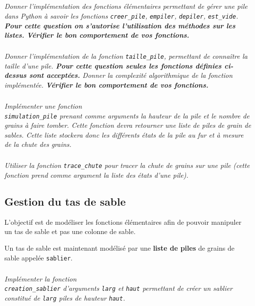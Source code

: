 \documentclass[10pt,fleqn]{article} %
\begin{document}
\begin{multicols}{2}
\subparagraph{}
\textit{Donner l'implémentation des fonctions élémentaires permettant de gérer une pile dans Python à savoir les fonctions \texttt{creer\_pile}, \texttt{empiler}, \texttt{depiler}, \texttt{est\_vide}. \textbf{Pour cette question on s'autorise l'utilisation des méthodes sur les listes.} \textbf{Vérifier le bon comportement de vos fonctions.}}


\subparagraph{}
\textit{Donner l'implémentation de la fonction \texttt{taille\_pile}, permettant de connaître la taille d'une pile. \textbf{Pour cette question seules les fonctions définies ci-dessus sont acceptées.} Donner la complexité algorithmique de la fonction implémentée. \textbf{Vérifier le bon comportement de vos fonctions.}}

\subparagraph{}
\textit{Implémenter une fonction \\ \texttt{simulation\_pile} prenant comme arguments la hauteur de la pile et le nombre de grains à faire tomber. Cette fonction devra retourner une liste de piles de grain de sables. Cette liste stockera donc les différents états de la pile au fur et à mesure de la chute des grains.}


\subparagraph{}
\textit{Utiliser la fonction  \texttt{trace\_chute} pour tracer la chute de grains sur une pile (cette fonction prend comme argument la liste des états d'une pile).}



%

\subsection*{Gestion du tas de sable}
\begin{obj}
L'objectif est de modéliser les fonctions élémentaires afin de pouvoir manipuler un tas de sable et pas une colonne de sable.
\end{obj}

Un tas de sable est maintenant modélisé par une \textbf{liste de piles} de grains de sable appelée \texttt{sablier}. 

\subparagraph{}\textit{Implémenter la fonction \\ \texttt{creation\_sablier} d'arguments \texttt{larg} et \texttt{haut} permettant de créer un sablier constitué de \texttt{larg} piles de hauteur \texttt{haut}.}



\end{multicols}
\end{document}
